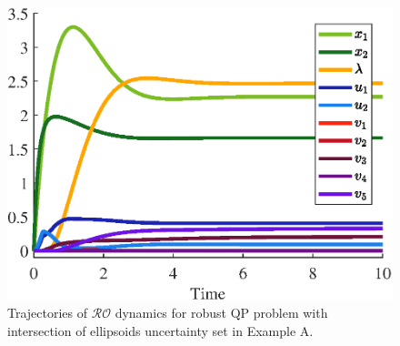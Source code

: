 \documentclass[journal,twoside,web]{ieeecolor}
\newcommand{\rev}[1]{\textcolor{revisionblue}{#1}}
\begin{document}
\begin{figure}
\begin{center}
\includegraphics[scale=0.55]{trajectories_intersection.eps}
\vspace{-1.5mm}
\caption{\rev{Trajectories of $\mathcal{RO}$ dynamics for robust QP problem with intersection of ellipsoids uncertainty set in Example A.}}
\label{trajectories_norm_intersection}
\end{center}
\end{figure}
\end{document}
